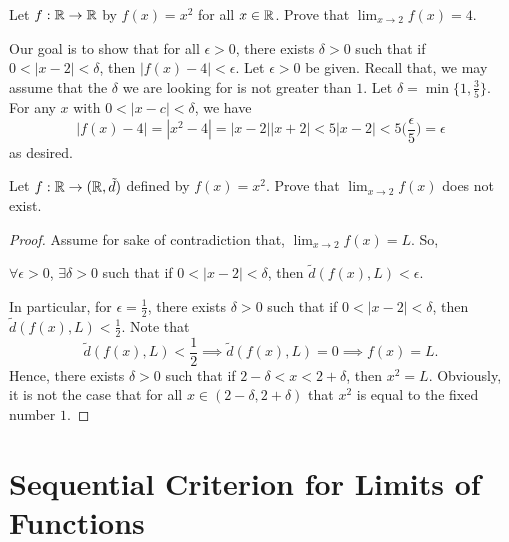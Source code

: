 \documentclass[a4paper]{article}
\begin{document}
\begin{eg}
    Let \( f: \mathbb{R} \to \mathbb{R}  \) by \( f(x) = x^{2} \) for all \( x \in \mathbb{R}  \). Prove that \( \lim_{ x \to 2 }  f(x) = 4 \). 

    Our goal is to show that for all \( \epsilon > 0  \), there exists \( \delta > 0  \) such that if \( 0 < | x - 2  | < \delta \), then \( | f(x) - 4  |  < \epsilon  \). Let \( \epsilon > 0  \) be given. Recall that, we may assume that the \( \delta  \) we are looking for is not greater than \( 1  \). Let \( \delta = \min \{ 1 , \frac{ 3 }{ 5 }  \}  \). For any \( x  \) with \( 0 < | x - c  | < \delta \), we have 
    \[  | f(x) - 4  |   = | x^{2} - 4  |  = | x - 2  |  | x + 2  | < 5 | x - 2  |  < 5 \Big( \frac{ \epsilon  }{ 5  } \Big)  = \epsilon  \]
    as desired.
\end{eg}

\begin{eg}
    Let \( f: \mathbb{R} \to (\mathbb{R}, \tilde{d}) \) defined by \( f(x) = x^{2} \). Prove that \( \lim_{ x \to 2 } f(x)  \) does not exist. 
\end{eg}
\begin{proof}
Assume for sake of contradiction that, \( \lim_{ x \to 2 }  f(x) =  L \). So, 
\begin{center}
    \( \forall \epsilon > 0  \), \( \exists \delta > 0  \) such that if \(  0 < |  x - 2  |  < \delta  \), then \( \tilde{d}(f(x), L) < \epsilon \).
\end{center}
In particular, for \( \epsilon = \frac{ 1 }{ 2 }  \), there exists \( \delta > 0  \) such that if \( 0 < | x - 2  |  < \delta  \), then \( \tilde{d}(f(x), L) < \frac{ 1 }{ 2 }  \). Note that 
\[  \tilde{d}(f(x), L) < \frac{ 1 }{ 2 } \implies \tilde{d}(f(x), L) = 0 \implies f(x) = L.  \]
Hence, there exists \( \delta > 0  \) such that if \( 2 - \delta < x < 2 + \delta  \), then \( x^{2} = L  \). Obviously, it is not the case that for all \( x \in (2-  \delta, 2 + \delta) \) that \( x^{2}  \) is equal to the fixed number \( 1  \). 
\end{proof}

\section{Sequential Criterion for Limits of Functions}\label{Sequential Criterion for Limits of Functions}
\end{document}
